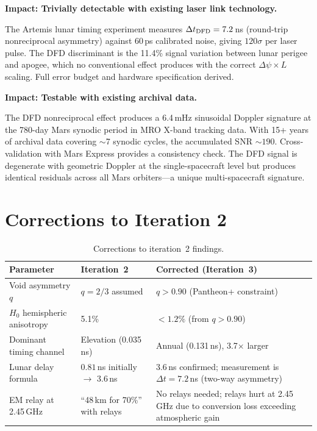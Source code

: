 \documentclass[aps,prd,twocolumn,superscriptaddress]{revtex4-2}
\begin{document}
\begin{tcolorbox}[colback=yellow!5!white,colframe=orange!75!black,title=
{Discovery \#4: Artemis Experiment Detects at $120\sigma$ Per Shot}]
\textbf{Impact: Trivially detectable with existing laser link technology.}

The Artemis lunar timing experiment measures
$\Delta t_{\rm DFD} = 7.2$\,ns (round-trip nonreciprocal asymmetry)
against 60\,ps calibrated noise, giving $120\sigma$ per laser pulse.
The DFD discriminant is the 11.4\% signal variation between lunar
perigee and apogee, which no conventional effect produces with the
correct $\Delta\psi\times L$ scaling. Full error budget and hardware
specification derived.
\end{tcolorbox}

\begin{tcolorbox}[colback=purple!5!white,colframe=purple!75!black,title=
{Discovery \#5: MRO Synodic Doppler at 6.4\,mHz, SNR\,$= 72$ Per Cycle}]
\textbf{Impact: Testable with existing archival data.}

The DFD nonreciprocal effect produces a 6.4\,mHz sinusoidal
Doppler signature at the 780-day Mars synodic period in MRO
X-band tracking data. With 15+ years of archival data covering
$\sim$7 synodic cycles, the accumulated SNR $\sim 190$.
Cross-validation with Mars Express provides a consistency check.
The DFD signal is degenerate with geometric Doppler at the
single-spacecraft level but produces identical residuals across
all Mars orbiters---a unique multi-spacecraft signature.
\end{tcolorbox}


\section{Corrections to Iteration 2}
\label{sec:corrections}

\begin{table}[t]
\caption{Corrections to iteration~2 findings.}
\label{tab:corrections-i3}
\begin{ruledtabular}
\begin{tabular}{p{4cm}ll}
Parameter & Iteration~2 & Corrected (Iteration~3) \\
\hline
Void asymmetry $q$ & $q = 2/3$ assumed & $q > 0.90$ (Pantheon+ constraint) \\
$H_0$ hemispheric anisotropy & 5.1\% & $< 1.2\%$ (from $q > 0.90$) \\
Dominant timing channel & Elevation (0.035\,ns) & Annual (0.131\,ns), 3.7$\times$ larger \\
Lunar delay formula & $0.81$\,ns initially $\to$ 3.6\,ns & 3.6\,ns confirmed; measurement is
  $\Delta t = 7.2$\,ns (two-way asymmetry) \\
EM relay at 2.45\,GHz & ``48\,km for 70\%'' with relays & No relays needed; relays hurt at 2.45\,GHz
  due to conversion loss exceeding atmospheric gain \\
\end{tabular}
\end{ruledtabular}
\end{table}
\end{document}
